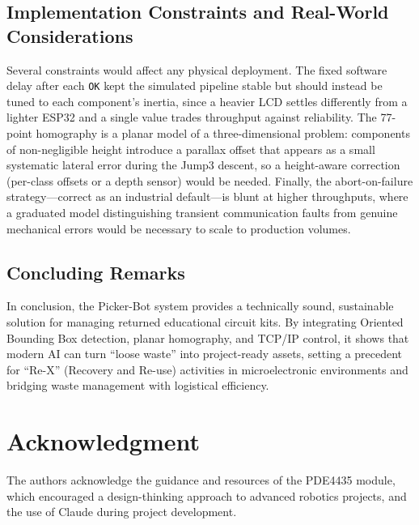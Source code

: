 \documentclass[11pt,conference]{IEEEtran}
\begin{document}
\subsection{Implementation Constraints and Real-World Considerations}
Several constraints would affect any physical deployment. The fixed software delay after each \texttt{OK} kept the simulated pipeline stable but should instead be tuned to each component's inertia, since a heavier LCD settles differently from a lighter ESP32 and a single value trades throughput against reliability. The 77-point homography is a planar model of a three-dimensional problem: components of non-negligible height introduce a parallax offset that appears as a small systematic lateral error during the Jump3 descent, so a height-aware correction (per-class offsets or a depth sensor) would be needed. Finally, the abort-on-failure strategy---correct as an industrial default---is blunt at higher throughputs, where a graduated model distinguishing transient communication faults from genuine mechanical errors would be necessary to scale to production volumes.
\subsection{Concluding Remarks}
In conclusion, the Picker-Bot system provides a technically sound, sustainable solution for managing returned educational circuit kits. By integrating Oriented Bounding Box detection, planar homography, and TCP/IP control, it shows that modern AI can turn ``loose waste'' into project-ready assets, setting a precedent for ``Re-X'' (Recovery and Re-use) activities in microelectronic environments and bridging waste management with logistical efficiency.
\section*{Acknowledgment}
The authors acknowledge the guidance and resources of the PDE4435 module, which encouraged a design-thinking approach to advanced robotics projects, and the use of Claude during project development.
\end{document}
